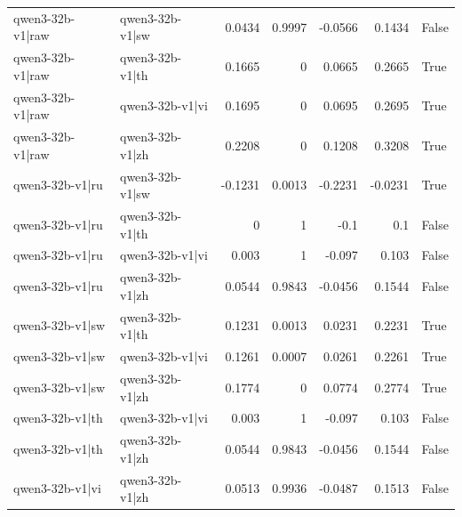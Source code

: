 \begin{table}
\begin{tabular}{l l r r r r l}
qwen3-32b-v1|raw & qwen3-32b-v1|sw & 0.0434 & 0.9997 & -0.0566 & 0.1434 & False \\
qwen3-32b-v1|raw & qwen3-32b-v1|th & 0.1665 & 0 & 0.0665 & 0.2665 & True \\
qwen3-32b-v1|raw & qwen3-32b-v1|vi & 0.1695 & 0 & 0.0695 & 0.2695 & True \\
qwen3-32b-v1|raw & qwen3-32b-v1|zh & 0.2208 & 0 & 0.1208 & 0.3208 & True \\
qwen3-32b-v1|ru & qwen3-32b-v1|sw & -0.1231 & 0.0013 & -0.2231 & -0.0231 & True \\
qwen3-32b-v1|ru & qwen3-32b-v1|th & 0 & 1 & -0.1 & 0.1 & False \\
qwen3-32b-v1|ru & qwen3-32b-v1|vi & 0.003 & 1 & -0.097 & 0.103 & False \\
qwen3-32b-v1|ru & qwen3-32b-v1|zh & 0.0544 & 0.9843 & -0.0456 & 0.1544 & False \\
qwen3-32b-v1|sw & qwen3-32b-v1|th & 0.1231 & 0.0013 & 0.0231 & 0.2231 & True \\
qwen3-32b-v1|sw & qwen3-32b-v1|vi & 0.1261 & 0.0007 & 0.0261 & 0.2261 & True \\
qwen3-32b-v1|sw & qwen3-32b-v1|zh & 0.1774 & 0 & 0.0774 & 0.2774 & True \\
qwen3-32b-v1|th & qwen3-32b-v1|vi & 0.003 & 1 & -0.097 & 0.103 & False \\
qwen3-32b-v1|th & qwen3-32b-v1|zh & 0.0544 & 0.9843 & -0.0456 & 0.1544 & False \\
qwen3-32b-v1|vi & qwen3-32b-v1|zh & 0.0513 & 0.9936 & -0.0487 & 0.1513 & False \\
\bottomrule
\end{tabular}
\end{table}
